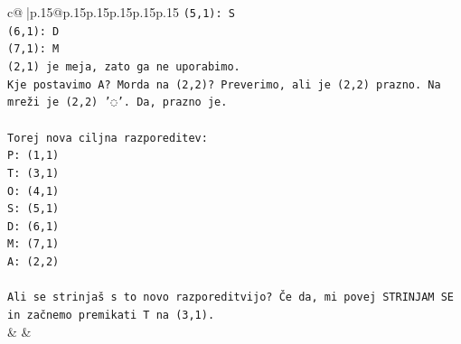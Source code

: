 \documentclass{article}
\begin{document}
{\begin{supertabular}{c@{$\;$}|p{.15\linewidth}@{}p{.15\linewidth}p{.15\linewidth}p{.15\linewidth}p{.15\linewidth}p{.15\linewidth}}
{{{\texttt{(5,1): S} \\
\texttt{(6,1): D} \\
\texttt{(7,1): M} \\
\texttt{(2,1) je meja, zato ga ne uporabimo.} \\
\texttt{Kje postavimo A? Morda na (2,2)? Preverimo, ali je (2,2) prazno. Na mreži je (2,2) '◌'. Da, prazno je.} \\
\\ 
\texttt{Torej nova ciljna razporeditev:} \\
\texttt{P: (1,1)} \\
\texttt{T: (3,1)} \\
\texttt{O: (4,1)} \\
\texttt{S: (5,1)} \\
\texttt{D: (6,1)} \\
\texttt{M: (7,1)} \\
\texttt{A: (2,2)} \\
\\ 
\texttt{Ali se strinjaš s to novo razporeditvijo? Če da, mi povej STRINJAM SE in začnemo premikati T na (3,1).} \\
            }
        }
    }
    & & \\ \\


\end{supertabular}}
\end{document}
